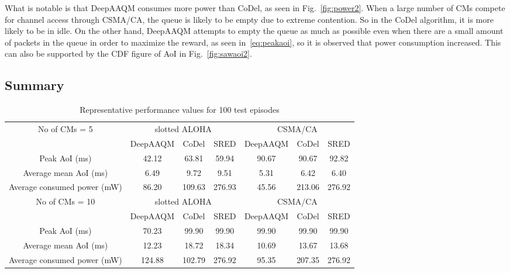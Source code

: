 \documentclass[journal]{IEEEtran}
\begin{document}
What is notable is that DeepAAQM consumes more power than CoDel, as seen in Fig.~\ref{fig:power2}. When a large number of CMs compete for channel access through CSMA/CA, the queue is likely to be empty due to extreme contention. So in the CoDel algorithm, it is more likely to be in idle. On the other hand, DeepAAQM attempts to empty the queue as much as possible even when there are a small amount of packets in the queue in order to maximize the reward, as seen in~\eqref{eq:peakaoi}, so it is observed that power consumption increased. This can also be supported by the CDF figure of AoI in Fig.~\ref{fig:sawaoi2}.


\subsection{Summary}
\label{subsec:summary}

\begin{table*}
\caption{Representative performance values for 100 test episodes}
\centering
\begin{tabular}{c|ccc|ccc}
\hline
\hline
\multirow{2}{*}{No of CMs = 5} & \multicolumn{3}{c|}{slotted ALOHA} & 
\multicolumn{3}{c}{CSMA/CA} \\
                            & DeepAAQM     & CoDel    & SRED    & DeepAAQM   & CoDel  & SRED  \\
\hline
Peak AoI (ms)               & 42.12        & 63.81    & 59.94   & 90.67      & 90.67  & 92.82 \\
Average mean AoI (ms)       &  6.49        &  9.72    &  9.51   &  5.31      &  6.42  &  6.40 \\
Average consumed power (mW) & 86.20        & 109.63   & 276.93  & 45.56      & 213.06 & 276.92\\
\hline
\hline
\multirow{2}{*}{No of CMs = 10} & \multicolumn{3}{c|}{slotted ALOHA} & \multicolumn{3}{c}{CSMA/CA} \\
                            & DeepAAQM     & CoDel    & SRED    & DeepAAQM   & CoDel  & SRED  \\
\hline
Peak AoI (ms)               & 70.23        & 99.90    & 99.90   & 99.90      & 99.90  & 99.90 \\
Average mean AoI (ms)       & 12.23        & 18.72    & 18.34   & 10.69      & 13.67  & 13.68 \\
Average consumed power (mW) & 124.88       & 102.79   & 276.92  & 95.35      & 207.35 & 276.92\\
\hline
\hline
\end{tabular}
\label{tab:results}
\end{table*}
\end{document}
